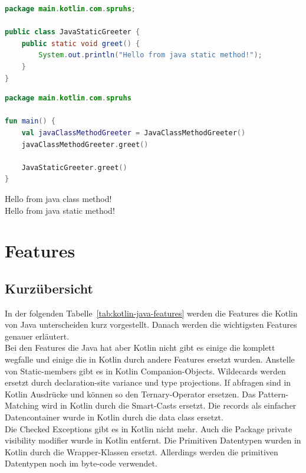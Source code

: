 \documentclass[11pt]{article}
\begin{document}
    \begin{lstlisting}[language=Java, caption={JavaStaticGreeter.java}]
package main.kotlin.com.spruhs;

public class JavaStaticGreeter {
    public static void greet() {
        System.out.println("Hello from java static method!");
    }
}

    \end{lstlisting}

    \begin{lstlisting}[language=Kotlin, caption={Main.kt}]
package main.kotlin.com.spruhs

fun main() {
    val javaClassMethodGreeter = JavaClassMethodGreeter()
    javaClassMethodGreeter.greet()

    JavaStaticGreeter.greet()
}
    \end{lstlisting}

    \begin{tcolorbox}[colback=black!5!white, colframe=black, title=Ausgabe]
        Hello from java class method!\\
        Hello from java static method!\\
    \end{tcolorbox}

    \section{Features}

    \subsection{Kurzübersicht}

    In der folgenden Tabelle~\ref{tab:kotlin-java-features} werden die Features die Kotlin von Java unterscheiden kurz vorgestellt. Danach werden die
    wichtigsten Features genauer erläutert. \\
    Bei den Features die Java hat aber Kotlin nicht gibt es einige die komplett wegfalle und einige die in Kotlin durch andere Features ersetzt wurden.
    Anstelle von Static-members gibt es in Kotlin Companion-Objects. Wildecards werden ersetzt durch declaration-site variance und type projections.
    If abfragen sind in Kotlin Ausdrücke und können so den Ternary-Operator ersetzen. Das Pattern-Matching wird in Kotlin durch die Smart-Casts ersetzt.
    Die records als einfacher Datencontainer wurde in Kotlin durch die data class ersetzt.\\
    Die Checked Exceptions gibt es in Kotlin nicht mehr. Auch die Package private visibility modifier wurde in Kotlin entfernt.
    Die Primitiven Datentypen wurden in Kotlin durch die Wrapper-Klassen ersetzt. Allerdings werden die primitiven Datentypen noch im byte-code verwendet.\\
    \cite{doc-comparison}
\end{document}
